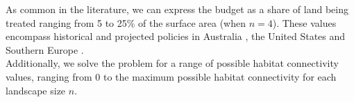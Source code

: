 \begin{table}[h]
\centering
\onehalfspacing
{}
\caption{Summary of model variables and functions}
\end{table}
As common in the literature, we can express the budget as a share of land being treated ranging from %
5 to 25\% of the surface area (when $n=4$). These values encompass historical and projected policies in Australia \citep{burrows2013}, the United States \citep{GAO2019} and Southern Europe \citep{Fernandes2013}.
\\
Additionally, we solve the problem for a range of possible habitat connectivity values, ranging from $0$ to the maximum possible habitat connectivity for each landscape size $n$.

\clearpage

